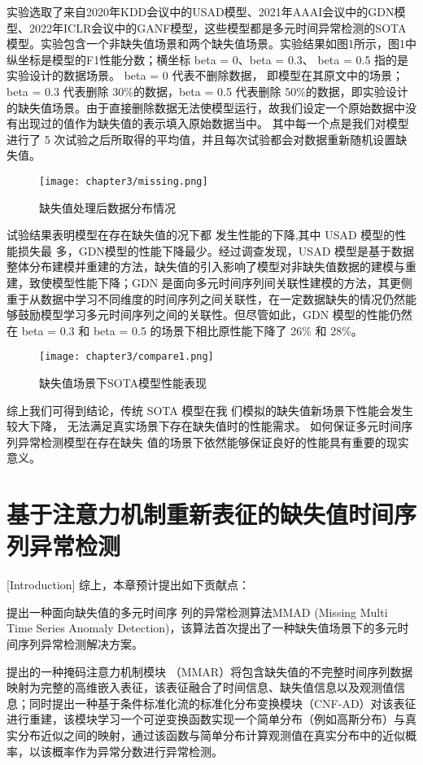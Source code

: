 实验选取了来自2020年KDD会议中的USAD模型、2021年AAAI会议中的GDN模型、2022年ICLR会议中的GANF模型，这些模型都是多元时间异常检测的SOTA模型。实验包含一个非缺失值场景和两个缺失值场景。实验结果如图1所示，图1中纵坐标是模型的F1性能分数；横坐标 beta = 0、beta = 0.3、 beta = 0.5 指的是实验设计的数据场景。 beta = 0 代表不删除数据， 即模型在其原文中的场景；beta = 0.3 代表删除 30\%的数据，beta = 0.5 代表删除 50\%的数据，即实验设计的缺失值场景。由于直接删除数据无法使模型运行，故我们设定一个原始数据中没有出现过的值作为缺失值的表示填入原始数据当中。 其中每一个点是我们对模型进行了 5 次试验之后所取得的平均值，并且每次试验都会对数据重新随机设置缺失值。
\begin{figure}[ht]
  \centering
  \texttt{[image: chapter3/missing.png]}
  \caption{缺失值处理后数据分布情况}
  \end{figure}

试验结果表明模型在存在缺失值的况下都 发生性能的下降,其中 USAD 模型的性能损失最 多，GDN模型的性能下降最少。经过调查发现，USAD 模型是基于数据整体分布建模并重建的方法，缺失值的引入影响了模型对非缺失值数据的建模与重建，致使模型性能下降；GDN 是面向多元时间序列间关联性建模的方法，其更侧重于从数据中学习不同维度的时间序列之间关联性，在一定数据缺失的情况仍然能够鼓励模型学习多元时间序列之间的关联性。但尽管如此，GDN 模型的性能仍然在 beta = 0.3 和 beta = 0.5 的场景下相比原性能下降了 26\% 和 28\%。

\begin{figure}[ht]
    \centering
    \texttt{[image: chapter3/compare1.png]}
    \caption{缺失值场景下SOTA模型性能表现}
    \end{figure}
  
  综上我们可得到结论，传统 SOTA 模型在我 们模拟的缺失值新场景下性能会发生较大下降， 无法满足真实场景下存在缺失值时的性能需求。 如何保证多元时间序列异常检测模型在存在缺失 值的场景下依然能够保证良好的性能具有重要的现实意义。


\section{基于注意力机制重新表征的缺失值时间序列异常检测}[Introduction]
综上，本章预计提出如下贡献点：

提出一种面向缺失值的多元时间序 列的异常检测算法MMAD (Missing Multi Time Series Anomaly Detection)，该算法首次提出了一种缺失值场景下的多元时间序列异常检测解决方案。

提出的一种掩码注意力机制模块 （MMAR）将包含缺失值的不完整时间序列数据映射为完整的高维嵌入表征，该表征融合了时间信息、缺失值信息以及观测值信息；同时提出一种基于条件标准化流的标准化分布变换模块（CNF-AD）对该表征进行重建，该模块学习一个可逆变换函数实现一个简单分布（例如高斯分布）与真实分布近似之间的映射，通过该函数与简单分布计算观测值在真实分布中的近似概率，以该概率作为异常分数进行异常检测。


